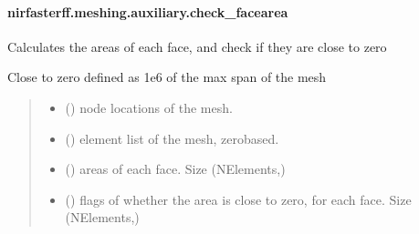 \documentclass[letterpaper,10pt,english]{sphinxmanual}
\begin{document}
\sphinxstepscope


\paragraph{nirfasterff.meshing.auxiliary.check\_facearea}
\label{\detokenize{_autosummary/nirfasterff.meshing.auxiliary.check_facearea:nirfasterff-meshing-auxiliary-check-facearea}}\label{\detokenize{_autosummary/nirfasterff.meshing.auxiliary.check_facearea::doc}}

\begin{fulllineitems}
\label{\detokenize{_autosummary/nirfasterff.meshing.auxiliary.check_facearea:nirfasterff.meshing.auxiliary.check_facearea}}
\pysigstartsignatures
{}
\pysigstopsignatures
\sphinxAtStartPar
Calculates the areas of each face, and check if they are close to zero

\sphinxAtStartPar
Close to zero defined as 1e6 of the max span of the mesh
\begin{quote}\begin{description}
\begin{itemize}
\item {} 
\sphinxAtStartPar
{} () \textendash{} node locations of the mesh.

\item {} 
\sphinxAtStartPar
{} () \textendash{} element list of the mesh, zero\sphinxhyphen{}based.

\end{itemize}

\sphinxAtStartPar
\begin{itemize}
\item {} 
\sphinxAtStartPar
{} () \textendash{} areas of each face. Size (NElements,)

\item {} 
\sphinxAtStartPar
{} () \textendash{} flags of whether the area is close to zero, for each face. Size (NElements,)

\end{itemize}


\end{description}\end{quote}

\end{fulllineitems}
\end{document}
